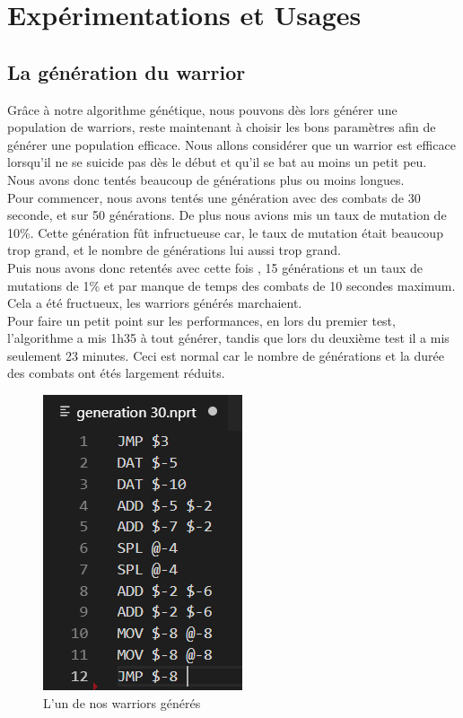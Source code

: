 \documentclass[a4paper,12pt]{article}
\begin{document}
\section{Expérimentations et Usages}
\subsection{La génération du warrior}
Grâce à notre algorithme génétique, nous pouvons dès lors générer une population de warriors, reste maintenant à choisir les bons paramètres afin de générer une population efficace. Nous allons considérer que un warrior est efficace lorsqu'il ne se suicide pas dès le début et qu'il se bat au moins un petit peu.\\
Nous avons donc tentés beaucoup de générations plus ou moins longues.\\
Pour commencer, nous avons tentés une génération avec des combats de 30 seconde, et sur 50 générations. De plus nous avions mis un taux de mutation de 10\%. Cette génération fût infructueuse car, le taux de mutation était beaucoup trop grand, et le nombre de générations lui aussi trop grand.\\
Puis nous avons donc retentés avec cette fois , 15 générations et un taux de mutations de 1\% et par manque de temps des combats de 10 secondes maximum. Cela a été fructueux, les warriors générés marchaient.\\
Pour faire un petit point sur les performances, en lors du premier test, l'algorithme a mis 1h35 à tout générer, tandis que lors du deuxième test il a mis seulement 23 minutes. Ceci est normal car le nombre de générations et la durée des combats ont étés largement réduits. 
\begin{figure}[H]
\includegraphics[scale=1]{warior.png}
\caption{L'un de nos warriors générés}
\end{figure}
\end{document}
